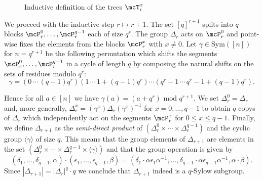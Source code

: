 \documentclass[a4paper,UKenglish]{lipics}
\newcommand{\inseg}[1]{\ensuremath{[#1]}}
\newcommand{\card}[1]{\ensuremath{|#1|}}
\newcommand{\modulo}{\ensuremath{\text{mod }}}
\newcommand{\gengroup}[1]{\langle #1 \rangle}
\newcommand{\Sym}{\ensuremath{\text{Sym}}\xspace}
\theoremstyle{plain}
\begin{document}
\begin{figure}[ht]
\caption{Inductive definition of the trees $\mcT_i^x$}
\label{fig:definition:trees_q_sylow}
\end{figure}

We proceed with the inductive step $r \mapsto r+1$.
The set $\inseg q^{r+1}$ splits into $q$ blocks $\mcP_{r}^0, \dots,
\mcP_r^{q-1}$ each of size $q^{r}$.
The group $\Delta_r$ acts on $\mcP_{r}^0$ and point-wise fixes
the elements from the blocks $\mcP_{r}^x$ with $x \neq 0$.
Let $\gamma \in \Sym(\inseg n)$ for $n = q^{r+1}$ be the following 
permutation which shifts
the segments $\mcP_{r}^0, \dots, \mcP_r^{q-1}$ in a cycle of length $q$ by
composing the natural shifts on the sets of residues modulo $q^r$:
\[ \gamma = (0 \,  \cdots \, (q-1)q^r ) 
(1 \,  \cdots \, 1 + (q-1)q^r)  
\cdots
(q^r - 1 \,  \cdots \, q^r - 1 + (q-1)q^r).  
\]

Hence for all $a \in \inseg n $ we have $\gamma(a) = (a + q^r) \,\,\modulo 
q^{r+1}$.
We set $\Delta^{0}_r = \Delta_r$ and, more generally, $\Delta^{x}_r =
(\gamma^x) \Delta_r (\gamma^x)^{-1}$ for $x = 0, \dots, q-1$ to 
obtain $q$ copys of $\Delta_r$ which independently act on the segments
$\mcP_r^x$ for $0 \leq x \leq q-1$. 
Finally, we define $\Delta_{r+1}$ 
as the \emph{semi-direct product} of $(\Delta^{0}_r \times \cdots \times
\Delta^{q-1}_r)$ and the cyclic group $\gengroup{\gamma}$ of size $q$.
This means that the group elements of $\Delta_{r+1}$ are elements in the set
$(\Delta^{0}_r \times \cdots \times \Delta^{q-1}_r \times 
\gengroup{\gamma})$
and that the group operation is given by
\[ 
(\delta_1, \dots, \delta_{q-1}, \alpha) \cdot (\epsilon_1, \dots,
\epsilon_{q-1}, \beta) 
= (\delta_1 \cdot \alpha \epsilon_1 \alpha^{-1}, \dots, \delta_{q-1} \cdot
\alpha \epsilon_{q-1} \alpha^{-1}, \alpha\cdot \beta).
\]
Since $\card{\Delta_{r+1}} = \card{\Delta_r}^q \cdot q$ we conclude that
$\Delta_{r+1}$ indeed is a $q$-Sylow subgroup.
\end{document}
